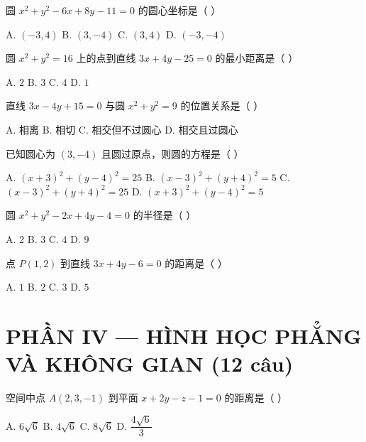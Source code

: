 \documentclass[11pt, a4paper]{article}
\begin{document}
\begin{baitap}[31]
圆 $x^2+y^2-6x+8y-11=0$ 的圆心坐标是（ ）
\par\vspace{3pt}
\noindent A. $(-3,4)$ \quad B. $(3,-4)$ \quad C. $(3,4)$ \quad D. $(-3,-4)$
\end{baitap}

\begin{baitap}[32]
圆 $x^2+y^2=16$ 上的点到直线 $3x+4y-25=0$ 的最小距离是（ ）
\par\vspace{3pt}
\noindent A. $2$ \quad B. $3$ \quad C. $4$ \quad D. $1$
\end{baitap}

\begin{baitap}[33]
直线 $3x-4y+15=0$ 与圆 $x^2+y^2=9$ 的位置关系是（ ）
\par\vspace{3pt}
\noindent A. 相离 \quad B. 相切 \quad C. 相交但不过圆心 \quad D. 相交且过圆心
\end{baitap}

\begin{baitap}[34]
已知圆心为 $(3,-4)$ 且圆过原点，则圆的方程是（ ）
\par\vspace{3pt}
\noindent A. $(x+3)^2+(y-4)^2=25$ \quad B. $(x-3)^2+(y+4)^2=5$ \quad C. $(x-3)^2+(y+4)^2=25$ \quad D. $(x+3)^2+(y-4)^2=5$
\end{baitap}

\begin{baitap}[35]
圆 $x^2+y^2-2x+4y-4=0$ 的半径是（ ）
\par\vspace{3pt}
\noindent A. $2$ \quad B. $3$ \quad C. $4$ \quad D. $9$
\end{baitap}

\begin{baitap}[36]
点 $P(1,2)$ 到直线 $3x+4y-6=0$ 的距离是（ ）
\par\vspace{3pt}
\noindent A. $1$ \quad B. $2$ \quad C. $3$ \quad D. $5$
\end{baitap}

\section{PHẦN IV — HÌNH HỌC PHẲNG VÀ KHÔNG GIAN (12 câu)}

\begin{baitap}[37]
空间中点 $A(2,3,-1)$ 到平面 $x+2y-z-1=0$ 的距离是（ ）
\par\vspace{3pt}
\noindent A. $6\sqrt{6}$ \quad B. $4\sqrt{6}$ \quad C. $8\sqrt{6}$ \quad D. $\dfrac{4\sqrt{6}}{3}$
\end{baitap}
\end{document}
